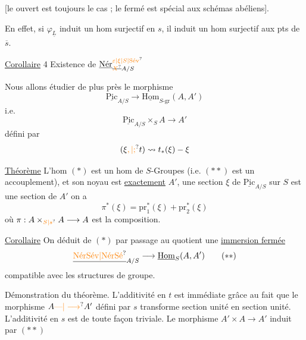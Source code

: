 [le ouvert est toujours le cas ; le fermé est spécial aux schémas abéliens].

En effet, si $\varphi_{\underline L}$ induit un hom surjectif en $s$, il induit un hom surjectif aux pts de $\overline s$.

\uline{Corollaire} 4 Existence de $\underline{\text{Nér}}^{\unsure{\varepsilon|\xi|S|\text{Sév}}}_{\deleted{\unsure{X}}A/S}$

Nous allons étudier de plus près le morphisme
\[
\underline{\mathrm{Pic}}_{A/S}\longrightarrow\underline{\mathrm{Hom}}_{S\text{-gr}}(A,A')\tag*{$(*)$}
\]
i.e.
\[
\underline{\mathrm{Pic}}_{A/S}\times_S A\longrightarrow A'\tag*{$(**)$}
\]
défini par
\[
(\xi\unsure{,|;}t)\rightsquigarrow t_*(\xi)-\xi
\]

\noindent\llap{\smash{\rule[-3.6ex]{0.4pt}{4ex}}\quad}\uline{Théorème} L'hom $(*)$ est un hom de $S$-Groupes  (i.e. $(**)$ est un accouplement), et son noyau est \uline{exactement} $A'$,    une section $\xi$ de $\underline{\mathrm{Pic}}_{A/S}$ sur $S$ est une  section de $A'$  on a
\[
\boxed{\pi^*(\xi)=\mathrm{pr}_1^*(\xi)+\mathrm{pr}_2^*(\xi)}
\]
où $\pi:A\times_{\unsure{S|s}} A\longrightarrow A$ est la  composition.

\noindent\llap{\smash{\rule[-1.8ex]{0.4pt}{2ex}}\quad}\uline{Corollaire} On déduit de $(*)$ par passage au quotient une \uline{immersion fermée}
\[
\underline{\text{\unsure{NérSév|NérSé}}}_{A/S}\longrightarrow\underline{\mathrm{Hom}}_S(A,A')\tag*{$(**)$}
\]
compatible avec les structures de groupe.

Démonstration du théorème. L'additivité en $t$ est immédiate grâce au fait que le morphisme $A\unsure{\text{---}|\longrightarrow}A'$ défini par $s$ transforme section unité en section unité. L'additivité en $s$ est de toute façon triviale. Le morphisme $A'\times A\longrightarrow A'$ induit par $(**)$

